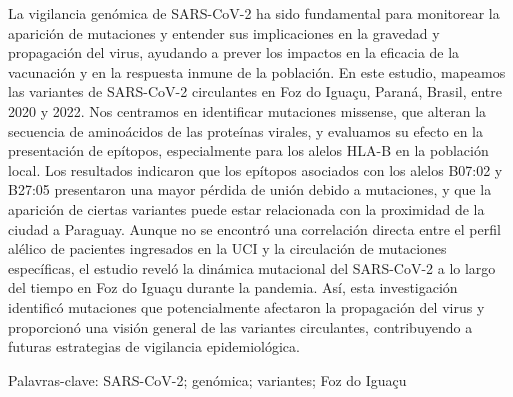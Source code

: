 


La vigilancia genómica de SARS-CoV-2 ha sido fundamental para monitorear la aparición de mutaciones y entender sus implicaciones en la gravedad y propagación del virus, ayudando a prever los impactos en la eficacia de la vacunación y en la respuesta inmune de la población. En este estudio, mapeamos las variantes de SARS-CoV-2 circulantes en Foz do Iguaçu, Paraná, Brasil, entre 2020 y 2022. Nos centramos en identificar mutaciones missense, que alteran la secuencia de aminoácidos de las proteínas virales, y evaluamos su efecto en la presentación de epítopos, especialmente para los alelos HLA-B en la población local. Los resultados indicaron que los epítopos asociados con los alelos B07:02 y B27:05 presentaron una mayor pérdida de unión debido a mutaciones, y que la aparición de ciertas variantes puede estar relacionada con la proximidad de la ciudad a Paraguay. Aunque no se encontró una correlación directa entre el perfil alélico de pacientes ingresados en la UCI y la circulación de mutaciones específicas, el estudio reveló la dinámica mutacional del SARS-CoV-2 a lo largo del tiempo en Foz do Iguaçu durante la pandemia. Así, esta investigación identificó mutaciones que potencialmente afectaron la propagación del virus y proporcionó una visión general de las variantes circulantes, contribuyendo a futuras estrategias de vigilancia epidemiológica.

\noindent Palavras-clave: SARS-CoV-2; genómica; variantes; Foz do Iguaçu


